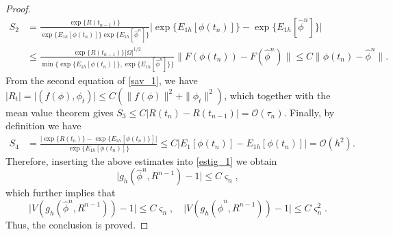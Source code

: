 \documentclass{m2an}
\newcommand{\mo}{\mathcal{O}}
\begin{document}
\begin{proof}
\begin{equation*}
\begin{aligned}
			S_{2} &   = \frac{ \exp \{ R( t_{n-1} ) \} }{ \exp \{E_{1 h}[ \phi( t_n ) ] \} \exp \{E_{1 h}[ \hat{\phi}^{n} ] \} } \big\vert \exp \{E_{1 h}[ \phi( t_n ) ] \} -  \exp \{E_{1 h}[ \hat{\phi}^{n} ] \} \big\vert \\
			& \leq \frac{ \exp \{ R( t_{n-1} ) \} \vert \Omega \vert^{1/2} }{ 
				\min\{ \exp \{E_{1 h}[ \phi( t_n ) ] \}, \exp \{E_{1 h}[ \hat{\phi}^{n} ] \} \} } \| F( \phi( t_{n} ) ) - F( \hat{\phi}^{n} ) \| \leq C \| \phi(t_{n}) - \hat{\phi}^{n}  \|.
		\end{aligned}
	\end{equation*}
	From the second equation of \eqref{sav_1}, we have $ \vert R_t \vert = \vert (f(\phi), \phi_t) \vert \leq C (\| f( \phi ) \|^2 + \| \phi_t \|^2) $, which together with the mean value theorem gives
	$
	S_{3} \leq C \big\vert R( t_{n} ) - R( t_{n-1} ) \big\vert   =\mo(\tau_{n}).
	$
	Finally, by  definition  we have
	\begin{equation*}
		\begin{aligned}
			S_{4} & = \frac{ \big\vert \exp \{ R( t_{n} ) \} - \exp \{ E_{1 h}[ \phi( t_{n} ) \} ] \big\vert }{ \exp \{E_{1 h}[ \phi( t_n ) ] \} }   \leq C \big\vert E_{1} [ \phi(t_n) ] - E_{1h} [ \phi(t_n) ] \big\vert =\mo( h^2).
		\end{aligned}
	\end{equation*}
	Therefore, inserting the above estimates into \eqref{estig_1} we obtain
	\begin{equation*}
		\big\vert g_h( \hat{\phi}^n, R^{n-1} ) - 1 \big\vert  \leq C \varsigma_n,
	\end{equation*}
	which further implies that
	$$
	\vert V( g_h( \hat{\phi}^n, R^{n-1} ) ) - 1 \vert  \leq C \varsigma_{n}, \quad  \vert V( g_h( \hat{\phi}^n, R^{n-1} ) ) - 1 \vert  \leq C \varsigma_{n}^2.
	$$
	Thus, the conclusion is proved.
\end{proof}
\end{document}
